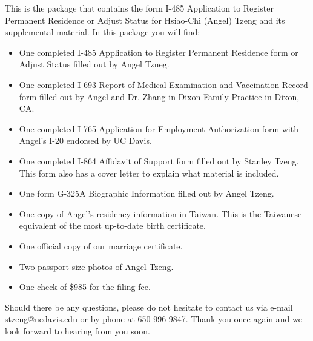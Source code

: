 \documentclass[stdletter]{newlfm}
\begin{document}
 
\begin{newlfm}
This is the package that contains the form I-485 Application to Register Permanent Residence or Adjust Status for Hsiao-Chi (Angel) Tzeng and its supplemental material.  In this package you will find:
\begin{itemize}

\item One completed I-485 Application to Register Permanent Residence form or Adjust Status filled out by Angel Tzneg.
\item One completed I-693 Report of Medical Examination and Vaccination Record form filled out by Angel and Dr. Zhang in Dixon Family Practice in Dixon, CA.
\item One completed I-765 Application for Employment Authorization form with Angel's I-20 endorsed by UC Davis.  
\item One completed I-864 Affidavit of Support form filled out by Stanley Tzeng.  This form also has a cover letter to explain what material is included.
\item One form G-325A Biographic Information filled out by Angel Tzeng.
\item One copy of Angel's residency information in Taiwan.  This is the Taiwanese equivalent of the most up-to-date birth certificate.
\item One official copy of our marriage certificate.
\item Two passport size photos of Angel Tzeng.
\item One check of \$985 for the filing fee.



\end{itemize}

Should there be any questions, please do not hesitate to contact us via e-mail stzeng@ucdavis.edu or by phone at 650-996-9847.  Thank you once again and we look forward to hearing from you soon.
\end{newlfm}
\end{document}
